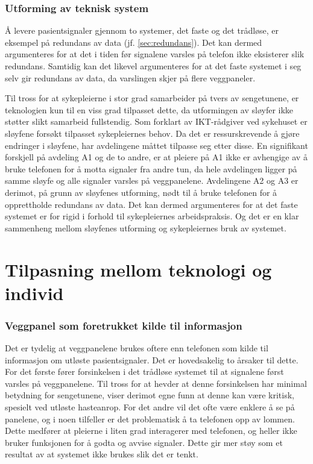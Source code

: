 \subsubsection{Utforming av teknisk system}
Å levere pasientsignaler gjennom to systemer, det faste og det trådløse, er eksempel på redundans av data (jf. \ref{sec:redundans}). Det kan dermed argumenteres for at det i tiden før signalene varsles på telefon ikke eksisterer slik redundans. Samtidig kan det likevel argumenteres for at det faste systemet i seg selv gir redundans av data, da varslingen skjer på flere veggpaneler. 

\noindent
Til tross for at sykepleierne i stor grad samarbeider på tvers av sengetunene, er teknologien kun til en viss grad tilpasset dette, da utformingen av sløyfer ikke støtter slikt samarbeid fullstendig. Som forklart av IKT-rådgiver ved sykehuset er sløyfene forsøkt tilpasset sykepleiernes behov. Da det er ressurskrevende å gjøre endringer i sløyfene, har avdelingene måttet tilpasse seg etter disse. En signifikant forskjell på avdeling A1 og de to andre, er at pleiere på A1 ikke er avhengige av å bruke telefonen for å motta signaler fra andre tun, da hele avdelingen ligger på samme sløyfe og alle signaler varsles på veggpanelene. Avdelingene A2 og A3 er derimot, på grunn av sløyfenes utforming, nødt til å bruke telefonen for å opprettholde redundans av data. Det kan dermed argumenteres for at det faste systemet er for rigid i forhold til sykepleiernes arbeidspraksis. Og det er en klar sammenheng mellom sløyfenes utforming og sykepleiernes bruk av systemet.

\section{Tilpasning mellom teknologi og individ}

\subsubsection{Veggpanel som foretrukket kilde til informasjon}
Det er tydelig at veggpanelene brukes oftere enn telefonen som kilde til informasjon om utløste pasientsignaler. Det er hovedsakelig to årsaker til dette. For det første fører forsinkelsen i det trådløse systemet til at signalene først varsles på veggpanelene. Til tross for at \citep{Sletten09} hevder at denne forsinkelsen har minimal betydning for sengetunene, viser derimot egne funn at denne kan være kritisk, spesielt ved utløste hasteanrop. For det andre vil det ofte være enklere å se på panelene, og i noen tilfeller er det problematisk å ta telefonen opp av lommen. Dette medfører at pleierne i liten grad interagerer med telefonen, og heller ikke bruker funksjonen for å godta og avvise signaler. Dette gir mer støy som et resultat av at systemet ikke brukes slik det er tenkt.

